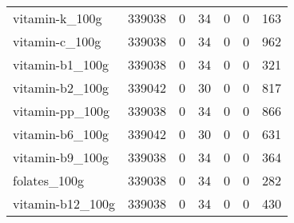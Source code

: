 \begin{tabular}{lrrrrrr}
vitamin-k\_100g                             &                                        339038 &                                         0 &                                            34 &                                         0 &                      0 &              163 \\
vitamin-c\_100g                             &                                        339038 &                                         0 &                                            34 &                                         0 &                      0 &              962 \\
vitamin-b1\_100g                            &                                        339038 &                                         0 &                                            34 &                                         0 &                      0 &              321 \\
vitamin-b2\_100g                            &                                        339042 &                                         0 &                                            30 &                                         0 &                      0 &              817 \\
vitamin-pp\_100g                            &                                        339038 &                                         0 &                                            34 &                                         0 &                      0 &              866 \\
vitamin-b6\_100g                            &                                        339042 &                                         0 &                                            30 &                                         0 &                      0 &              631 \\
vitamin-b9\_100g                            &                                        339038 &                                         0 &                                            34 &                                         0 &                      0 &              364 \\
folates\_100g                               &                                        339038 &                                         0 &                                            34 &                                         0 &                      0 &              282 \\
vitamin-b12\_100g                           &                                        339038 &                                         0 &                                            34 &                                         0 &                      0 &              430 \\

\end{tabular}
